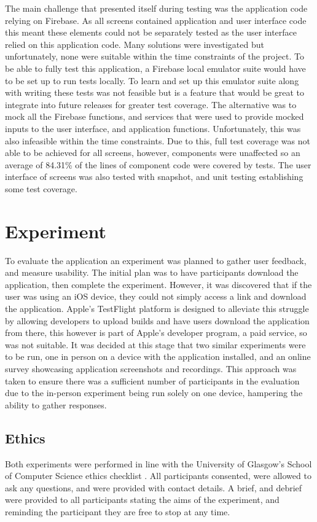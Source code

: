 The main challenge that presented itself during testing was the application code relying on Firebase. As all screens contained application and user interface code this meant these elements could not be separately tested as the user interface relied on this application code. Many solutions were investigated but unfortunately, none were suitable within the time constraints of the project. To be able to fully test this application, a Firebase local emulator suite would have to be set up to run tests locally. To learn and set up this emulator suite along with writing these tests was not feasible but is a feature that would be great to integrate into future releases for greater test coverage. The alternative was to mock all the Firebase functions, and services that were used to provide mocked inputs to the user interface, and application functions. Unfortunately, this was also infeasible within the time constraints. Due to this, full test coverage was not able to be achieved for all screens, however, components were unaffected so an average of 84.31\% of the lines of component code were covered by tests. The user interface of screens was also tested with snapshot, and unit testing establishing some test coverage.   


\section{Experiment}
To evaluate the application an experiment was planned to gather user feedback, and measure usability. The initial plan was to have participants download the application, then complete the experiment. However, it was discovered that if the user was using an iOS device, they could not simply access a link and download the application. Apple's TestFlight platform is designed to alleviate this struggle by allowing developers to upload builds and have users download the application from there, this however is part of Apple's developer program, a paid service, so was not suitable. It was decided at this stage that two similar experiments were to be run, one in person on a device with the application installed, and an online survey showcasing application screenshots and recordings. This approach was taken to ensure there was a sufficient number of participants in the evaluation due to the in-person experiment being run solely on one device, hampering the ability to gather responses. 

\subsection*{Ethics}
Both experiments were performed in line with the University of Glasgow's School of Computer Science ethics checklist \cite{ethics}. All participants consented, were allowed to ask any questions, and were provided with contact details. A brief, and debrief were provided to all participants stating the aims of the experiment, and reminding the participant they are free to stop at any time.

